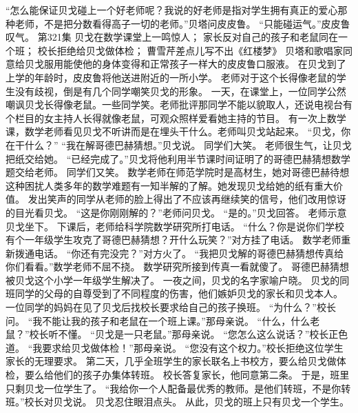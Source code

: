 \documentclass[a4paper,12pt,UTF8,twoside]{ctexbook}
\begin{document}
        “怎么能保证贝戈碰上一个好老师呢？我说的好老师是指对学生拥有真正的爱心那种老师，不是把分数看得高子一切的老师。”贝塔问皮皮鲁。  
        “只能碰运气。”皮皮鲁叹气。          第321集  
        贝戈在数学课堂上一鸣惊人；  
        家长反对自己的孩子和老鼠同在一个班；  
        校长拒绝给贝戈做体检；  
        曹雪芹差点儿写不出《红楼梦》    
        贝塔和歌唱家同意给贝戈服用能使他的身体变得和正常孩子一样大的皮皮鲁口服液。  
        在贝戈到了上学的年龄时，皮皮鲁将他送进附近的一所小学。  
        老师对于这个长得像老鼠的学生没有歧视，倒是有几个同学嘲笑贝戈的形象。  
        一天，在课堂上，一位同学公然嘲讽贝戈长得像老鼠。一些同学笑。老师批评那同学不能以貌取人，还说电视台有个栏目的女主持人长得就像老鼠，可观众照样爱看她主持的节目。        
        有一次上数学课，数学老师看见贝戈不听讲而是在埋头干什么。老师叫贝戈站起来。  
        “贝戈，你在干什么？”  
        “我在解哥德巴赫猜想。”贝戈说。  
        同学们大笑。  
        老师很生气，让贝戈把纸交给她。  
        “已经完成了。”贝戈将他利用半节课时间证明了的哥德巴赫猜想数学题交给老师。  
        同学们又笑。  
        数学老师在师范学院时是高材生，她对哥德巴赫待想这种困扰人类多年的数学难题有一知半解的了解。她发现贝戈给她的纸有重大价值。  
        发出笑声的同学从老师的脸上得出了不应该再继续笑的信号，他们改用惊讶的目光看贝戈。  
        “这是你刚刚解的？”老师问贝戈。  
        “是的。”贝戈回答。  
        老师示意贝戈坐下。  
        下课后，老师给科学院数学研究所打电话。  
        “什么？你是说你们学校有个一年级学生攻克了哥德巴赫猜想？开什么玩笑？”对方挂了电话。  
        数学老师重新拨通电话。  
        “你还有完没完？”对方火了。  
        “我把贝戈解的哥德巴赫猜想传真给你们看看。”数学老师不屈不挠。        
        数学研究所接到传真一看就傻了。  
        哥德巴赫猜想被贝戈这个小学一年级学生解决了。  
        一夜之间，贝戈的名字家喻户晓。  
        贝戈的同班同学的父母的自尊受到了不同程度的伤害，他们嫉妒贝戈的家长和贝戈本人。  
        一位同学的妈妈在见了贝戈后找校长要求给自己的孩子换班。  
        “为什么？”校长问。  
        “我不能让我的孩子和老鼠在一个班上课。”那母亲说。  
        “什么，什么老鼠？”校长听不懂。  
        “贝戈是一只老鼠。”那母亲说。  
        “您怎么这么说话？”校长正色道。  
        “我要求给贝戈做体检！”那母亲说。  
        “您没有这个权力。”校长拒绝这位学生家长的无理要求。  
        第二天，几乎全班学生的家长联名上书校方，要么给贝戈做体检，要么给他们的孩子办集体转班。  
        校长答复家长，他同意第二条。  
        于是，班里只剩贝戈一位学生了。  
        “我给你一个人配备最优秀的教师。是他们转班，不是你转班。”校长对贝戈说。  
        贝戈忍住眼泪点头。        
        从此，贝戈的班上只有贝戈一个学生。  
\end{document}
